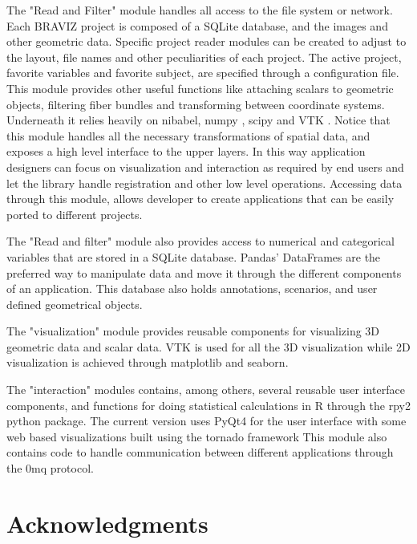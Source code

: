 \documentclass[utf8,paper]{frontiersSCNS} %
\begin{document}
The "Read and Filter" module handles all access to the file system or network. Each BRAVIZ project is composed of a SQLite database, and the images and other geometric data. Specific project reader modules can be created to adjust to the layout, file names and other peculiarities of each project. The active project, favorite variables and favorite subject, are specified through a configuration file. This module provides other useful functions like attaching scalars to geometric objects, filtering fiber bundles and transforming between coordinate systems. Underneath it relies heavily on nibabel\citep{gorgolewski_nipype:_2011}, numpy\citep{van_der_walt_numpy_2011} , scipy\citep{jones_scipy:_2001,oliphant_python_2007} and VTK\citep{schroeder_vtk_1998} . Notice that this module handles all the necessary transformations of spatial data, and exposes a high level interface to the upper layers. In this way application designers can focus on visualization and interaction as required by end users and let the library handle registration and other low level operations. Accessing data through this module, allows developer to create applications that can be easily ported to different projects. 

The "Read and filter" module also provides access to numerical and categorical variables that are stored in a SQLite database. Pandas' DataFrames\citep{mckinney_data_2010} are the preferred way to manipulate data and move it through the different components of an application. This database also holds annotations, scenarios, and user defined geometrical objects. 

The "visualization" module provides reusable components for visualizing 3D geometric data and scalar data. VTK is used for all the 3D visualization while 2D visualization is achieved through matplotlib \citep{hunter_matplotlib:_2007} and seaborn\citep{michael_waskom_seaborn:_2014}.

The "interaction" modules contains, among others, several reusable user interface components, and functions for doing statistical calculations in R\citep{team_r:_2012} through the rpy2 \citep{gautier_rpy2:_2008} python package. The current version uses PyQt4 for the user interface with some web based visualizations built using the tornado\citep{server_source_2008} framework  This module also contains code to handle communication between different applications through the 0mq protocol\citep{hintjens_zeromq:_2013}.


\section*{Acknowledgments}
\end{document}
